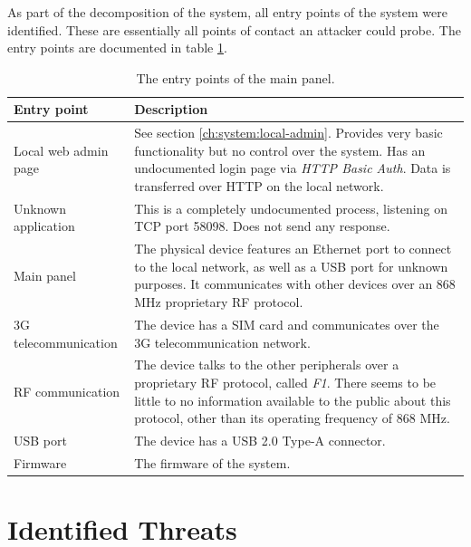 As part of the decomposition of the system, all entry points of the system were identified. These are essentially all points of contact an attacker could probe. The entry points are documented in table \ref{tb:entry-points}.
\begin{table}[!ht]
    \centering
    \begin{tabularx}{\textwidth}{l X}
        \hline
        \textbf{Entry point} & \textbf{Description}
        \\ \hline
        Local web admin page  & See section \ref{ch:system:local-admin}. Provides very basic functionality but no control over the system. Has an undocumented login page via \textit{HTTP Basic Auth}. Data is transferred over HTTP on the local network.
        \\ \hline
        Unknown application  & This is a completely undocumented process, listening on TCP port 58098. Does not send any response.
        \\ \hline
        Main panel  & The physical device features an Ethernet port to connect to the local network, as well as a USB port for unknown purposes. It communicates with other devices over an 868 MHz proprietary \gls{RF} protocol.
        \\ \hline
        3G telecommunication  & The device has a SIM card and communicates over the 3G telecommunication network.
        \\ \hline
        \gls{RF} communication  & The device talks to the other peripherals over a proprietary \gls{RF} protocol, called \textit{F1}. There seems to be little to no information available to the public about this protocol, other than its operating frequency of 868 MHz.
        \\ \hline
        USB port  & The device has a USB 2.0 Type-A connector.
        \\ \hline
        Firmware  & The firmware of the system.
        \\ \hline
    \end{tabularx}
    \caption{The entry points of the main panel.}
    \label{tb:entry-points}
\end{table}

\section{Identified Threats} \label{ch:threat-model:threats}
\newcommand{\owaspref}[1]{OWASP IoT \##1}
\newcommand{\etsiref}[1]{ETSI \##1}


